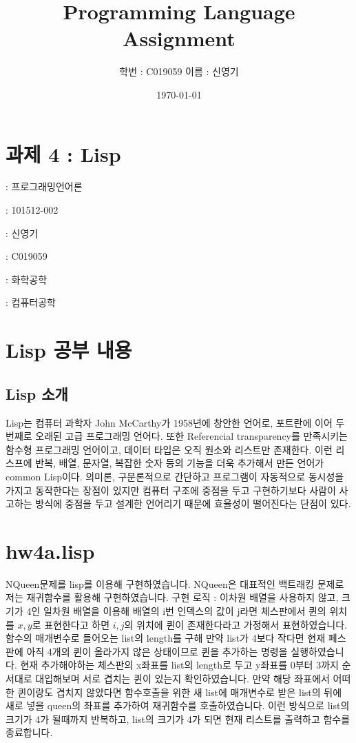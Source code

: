 \documentclass[11pt,oneside,a4paper]{article}
\begin{document}
\title{Programming Language Assignment}
\author{학번 : C019059 이름 : 신영기}
\date{\today}
\maketitle{}

\section{과제 4 : Lisp}

 : 프로그래밍언어론

 : 101512-002

 : 신영기

 : C019059

 : 화학공학

 : 컴퓨터공학

\section{Lisp 공부 내용}
\subsection{Lisp 소개}
Lisp는 컴퓨터 과학자 John McCarthy가 1958년에 창안한 언어로, 포트란에 이어 두 번째로 오래된 고급 프로그래밍 언어다.
또한 Referencial transparency를 만족시키는 함수형 프로그래밍 언어이고, 데이터 타입은 오직 원소와 리스트만 존재한다.
이런 리스프에 반복, 배열, 문자열, 복잡한 숫자 등의 기능을 더욱 추가해서 만든 언어가 common Lisp이다.
의미론, 구문론적으로 간단하고 프로그램이 자동적으로 동시성을 가지고 동작한다는 장점이 있지만 컴퓨터 구조에 중점을 두고 구현하기보다 
사람이 사고하는 방식에 중점을 두고 설계한 언어리기 때문에 효율성이 떨어진다는 단점이 있다.

\section{hw4a.lisp}
NQueen문제를 lisp를 이용해 구현하였습니다. NQueen은 대표적인 백트래킹 문제로 저는 재귀함수를 활용해 구현하였습니다.
구현 로직 : 이차원 배열을 사용하지 않고, 크기가 4인 일차원 배열을 이용해 배열의 i번 인덱스의 값이 j라면 
체스판에서 퀸의 위치를 \(x, y\)로 표현한다고 하면 \(i, j\)의 위치에 퀸이 존재한다라고 가정해서 표현하였습니다.
함수의 매개변수로 들어오는 list의 length를 구해 만약 list가 4보다 작다면 현재 페스판에 아직 4개의 퀸이 올라가지 않은 상태이므로 퀸을 추가하는 명령을 실행하였습니다.
현재 추가해야하는 체스판의 x좌표를 list의 length로 두고 y좌표를 0부터 3까지 순서대로 대입해보며 서로 겹치는 퀸이 있는지 확인하였습니다.
만약 해당 좌표에서 어떠한 퀸이랑도 겹치지 않았다면 함수호출을 위한 새 list에 매개변수로 받은 list의 뒤에 새로 넣을 queen의 좌표를 추가하여 재귀함수를 호출하였습니다.
이런 방식으로 list의 크기가 4가 될때까지 반복하고, list의 크기가 4가 되면 현재 리스트를 출력하고 함수를 종료합니다.
\end{document}
